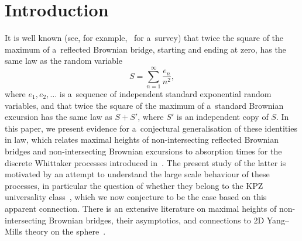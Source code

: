 \documentclass[pdftex]{sigma}
\theoremstyle{definition}
\begin{document}
\allowdisplaybreaks

\newcommand{\arXivNumber}{2601.06893}

\renewcommand{\PaperNumber}{069}

\FirstPageHeading










\section{Introduction}

It is well known (see, for example,~\cite{bpy} for a~survey)
that twice the square of the maximum of a~reflected Brownian bridge, starting and ending at zero,
has the same law as the random variable%
\begin{equation}\label{S} S=\sum_{n=1}^\infty \frac{e_n}{n^2},\end{equation}
where $e_1, e_2, \dots$ is a~sequence of independent standard exponential random variables, and that twice the square of the
maximum of a~standard Brownian excursion has the same law as $S+S'$, where $S'$ is an independent copy of $S$.
In this paper, we present evidence for a~conjectural generalisation of these identities in law, which relates maximal heights of non-intersecting
reflected Brownian bridges and non-intersecting Brownian excursions to absorption times for the discrete Whittaker processes introduced in~\cite{noc23}.
The present study of the latter is motivated by an attempt to understand the large scale behaviour of these processes,
in particular the question of whether they belong to the KPZ universality class~\cite{c}, which we now conjecture to be the case
based on this apparent connection. There is an extensive literature on maximal heights of non-intersecting Brownian bridges,
their asymptotics, and connections to 2D Yang--Mills theory on the sphere~\cite{f,fms,kat,lie,smcrf}.
\end{document}
